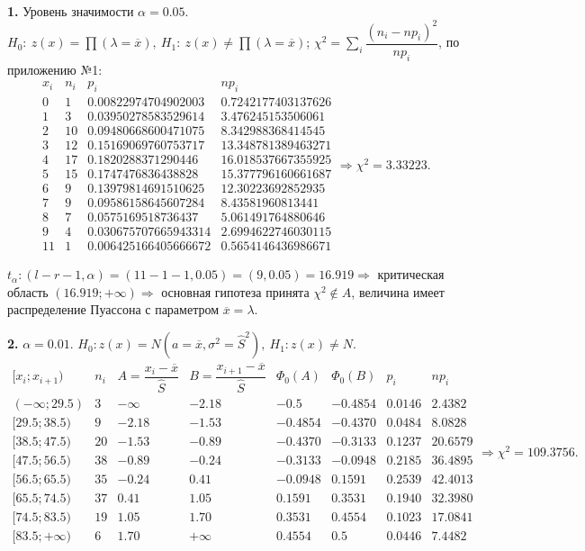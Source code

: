 \documentclass[9pt]{article}
\begin{document}
\ 
\par\textbf{1.} Уровень значимости \(\alpha=0.05\). \(H_0:\ z(x)=\prod(\lambda=\overline x),\ H_1:\ z(x)\neq \prod(\lambda=\overline x)\); \(\chi^2=\displaystyle\sum_i\dfrac{(n_i-np_i)^2}{np_i}\), по приложению №1:
\[\begin{array}{c|c|c|c}
    x_i & n_i & p_i & np_i\\
    \hline 
    0 & 1 & 0.00822974704902003 & 0.7242177403137626\\
    1 & 3 & 0.03950278583529614 & 3.476245153506061\\
    2 & 10 & 0.09480668600471075 & 8.342988368414545\\
    3 & 12 & 0.15169069760753717 & 13.348781389463271\\
    4 & 17 & 0.1820288371290446 & 16.018537667355925\\
    5 & 15 & 0.1747476836438828 & 15.377796160661687\\
    6 & 9 & 0.13979814691510625 & 12.30223692852935\\
    7 & 9 & 0.09586158645607284 & 8.43581960813441\\
    8 & 7 & 0.0575169518736437 & 5.061491764880646\\
    9 & 4 & 0.030675707665943314 & 2.6994622746030115\\
    11 & 1 & 0.006425166405666672 & 0.5654146436986671
\end{array}\Rightarrow\chi^2=3.33223.\]
\par\(t_\alpha: (l-r-1,\alpha)=(11-1-1,0.05)=(9,0.05)=16.919\Rightarrow\) критическая область \((16.919;+\infty)\Rightarrow\) основная гипотеза принята \(\chi^2\nin A\), величина имеет распределение Пуассона с параметром \(\overline x = \lambda\).
\par\textbf{2.} \(\alpha=0.01\). \(H_0:z(x)=N(a=\overline x,\sigma^2=\hat S^2),\ H_1:z(x)\neq N\).
\[\begin{array}{c|c|c|c|c|c|c|c}
    \lbrack x_i;x_{i+1}) & n_i & A=\dfrac{x_i-\overline x}{\hat S} & B=\dfrac{x_{i+1}-\overline x}{\hat S} & \Phi_0(A) & \Phi_0(B) & p_i & np_i\\
    \hline 
    (-\infty;29.5) & 3 & -\infty & -2.18 & -0.5 & -0.4854 & 0.0146 & 2.4382 \\
    \lbrack29.5;38.5) & 9 & -2.18 & -1.53 & -0.4854 & -0.4370 & 0.0484 & 8.0828 \\
    \lbrack38.5;47.5) & 20 & -1.53 & -0.89 & -0.4370 & -0.3133 & 0.1237 & 20.6579 \\
    \lbrack47.5;56.5) & 38 & -0.89 & -0.24 & -0.3133 & -0.0948 & 0.2185 & 36.4895 \\
    \lbrack56.5;65.5) & 35 & -0.24 & 0.41 & -0.0948 & 0.1591 & 0.2539 & 42.4013 \\
    \lbrack65.5;74.5) & 37 & 0.41 & 1.05 & 0.1591 & 0.3531 & 0.1940 & 32.3980 \\
    \lbrack74.5;83.5) & 19 & 1.05 & 1.70 & 0.3531 & 0.4554 & 0.1023 & 17.0841 \\
    \lbrack83.5;+\infty) & 6 & 1.70 & +\infty & 0.4554 & 0.5 & 0.0446 & 7.4482
\end{array}\Rightarrow\chi^2=109.3756.\]
\end{document}
